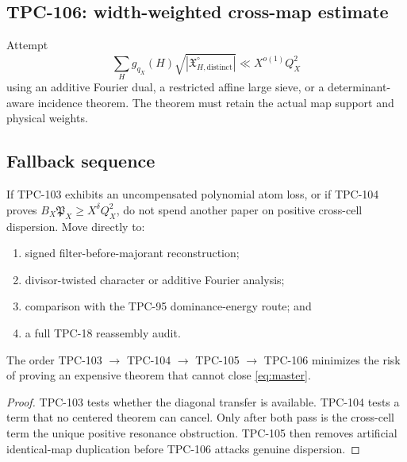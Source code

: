 \subsection*{TPC-106: width-weighted cross-map estimate}

Attempt
\[
 \sum_Hg_{q_X}(H)
 \sqrt{|\mathfrak X_{H,\mathrm{distinct}}^\circ|}
 \ll X^{o(1)}Q_X^2
\]
using an additive Fourier dual, a restricted affine large sieve, or
a determinant-aware incidence theorem.  The theorem must retain the
actual map support and physical weights.

\subsection*{Fallback sequence}

If TPC-103 exhibits an uncompensated polynomial atom loss, or if
TPC-104 proves
\(B_X\mathfrak P_X\ge X^\delta Q_X^2\), do not spend another paper
on positive cross-cell dispersion.  Move directly to:
\begin{enumerate}[leftmargin=2em]
\item signed filter-before-majorant reconstruction;
\item divisor-twisted character or additive Fourier analysis;
\item comparison with the TPC-95 dominance-energy route; and
\item a full TPC-18 reassembly audit.
\end{enumerate}

\begin{proposition}
\label{prop:next-order}
The order TPC-103 \(\to\) TPC-104 \(\to\) TPC-105
\(\to\) TPC-106 minimizes the risk of proving an expensive theorem
that cannot close \eqref{eq:master}.
\end{proposition}

\begin{proof}
TPC-103 tests whether the diagonal transfer is available.  TPC-104
tests a term that no centered theorem can cancel.  Only after both
pass is the cross-cell term the unique positive resonance
obstruction.  TPC-105 then removes artificial identical-map
duplication before TPC-106 attacks genuine dispersion.
\end{proof}
